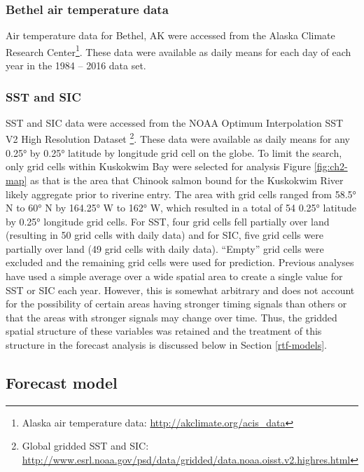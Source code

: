 \documentclass[12pt,]{book}
\let\rmarkdownfootnote\footnote%
\def\footnote{\protect\rmarkdownfootnote}
\theoremstyle{definition}
\theoremstyle{definition}
\theoremstyle{definition}
\theoremstyle{remark}
\begin{document}
\subsubsection{Bethel air temperature
data}\label{bethel-air-temperature-data}

\noindent
Air temperature data for Bethel, AK were accessed from the Alaska
Climate Research Center\footnote{Alaska air temperature data:
  \url{http://akclimate.org/acis_data}}. These data were available as
daily means for each day of each year in the 1984 -- 2016 data set.

\subsubsection{SST and SIC}\label{sst-and-sic}

\noindent
SST and SIC data were accessed from the NOAA Optimum Interpolation SST
V2 High Resolution Dataset \citep{reynolds-etal-2007}\footnote{Global
  gridded SST and SIC:
  \url{http://www.esrl.noaa.gov/psd/data/gridded/data.noaa.oisst.v2.highres.html}}.
These data were available as daily means for any 0.25° by 0.25° latitude
by longitude grid cell on the globe. To limit the search, only grid
cells within Kuskokwim Bay were selected for analysis Figure
\ref{fig:ch2-map} as that is the area that Chinook salmon bound for the
Kuskokwim River likely aggregate prior to riverine entry. The area with
grid cells ranged from 58.5° N to 60° N by 164.25° W to 162° W, which
resulted in a total of 54 0.25° latitude by 0.25° longitude grid cells.
For SST, four grid cells fell partially over land (resulting in 50 grid
cells with daily data) and for SIC, five grid cells were partially over
land (49 grid cells with daily data). ``Empty'' grid cells were excluded
and the remaining grid cells were used for prediction. Previous analyses
have used a simple average over a wide spatial area
\citep[e.g.,][]{mundy-evenson-2011} to create a single value for SST or
SIC each year. However, this is somewhat arbitrary and does not account
for the possibility of certain areas having stronger timing signals than
others or that the areas with stronger signals may change over time.
Thus, the gridded spatial structure of these variables was retained and
the treatment of this structure in the forecast analysis is discussed
below in Section \ref{rtf-models}.

\subsection{Forecast model}\label{reg-models}
\end{document}
